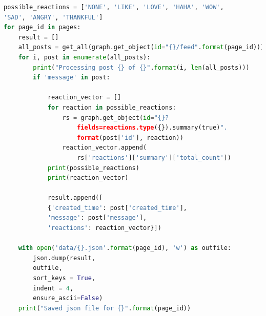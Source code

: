 \documentclass[11pt]{article}
\begin{document}
\begin{lstlisting}[language=Python]
possible_reactions = ['NONE', 'LIKE', 'LOVE', 'HAHA', 'WOW',
'SAD', 'ANGRY', 'THANKFUL']
for page_id in pages:
    result = []
    all_posts = get_all(graph.get_object(id="{}/feed".format(page_id)))
    for i, post in enumerate(all_posts):
        print("Processing post {} of {}".format(i, len(all_posts)))
        if 'message' in post:
            
            reaction_vector = []
            for reaction in possible_reactions:
                rs = graph.get_object(id="{}?
                	fields=reactions.type({}).summary(true)".
                	format(post['id'], reaction))
                reaction_vector.append(
                	rs['reactions']['summary']['total_count'])
            print(possible_reactions)
            print(reaction_vector)
                
            result.append([
            {'created_time': post['created_time'], 
            'message': post['message'], 
            'reactions': reaction_vector}])

    with open('data/{}.json'.format(page_id), 'w') as outfile:
        json.dump(result, 
        outfile, 
        sort_keys = True, 
        indent = 4, 
        ensure_ascii=False)
    print("Saved json file for {}".format(page_id))
\end{lstlisting}
\clearpage
\end{document}
